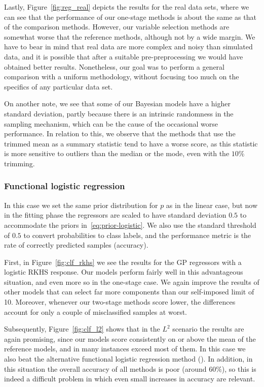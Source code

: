 \FloatBarrier{}

Lastly, Figure~\ref{fig:reg_real} depicts the results for the real data sets, where we can see that the performance of our one-stage methods is about the same as that of the comparison methods. However, our variable selection methods are somewhat worse that the reference methods, although not by a wide margin. We have to bear in mind that real data are more complex and noisy than simulated data, and it is possible that after a suitable pre-preprocessing we would have obtained better results. Nonetheless, our goal was to perform a general comparison with a uniform methodology, without focusing too much on the specifics of any particular data set.

On another note, we see that some of our Bayesian models have a higher standard deviation, partly because there is an intrinsic randomness in the sampling mechanism, which can be the cause of the occasional worse performance. In relation to this, we observe that the methods that use the trimmed mean as a summary statistic tend to have a worse score, as this statistic is more sensitive to outliers than the median or the mode, even with the \(10\%\) trimming.

\FloatBarrier{}
\subsubsection*{Functional logistic regression}

In this case we set the same prior distribution for \(p\) as in the linear case, but now in the fitting phase the regressors are scaled to have standard deviation \(0.5\) to accommodate the priors in~\eqref{eq:prior-logistic}. We also use the standard threshold of \(0.5\) to convert probabilities to class labels, and the performance metric is the rate of correctly predicted samples (accuracy). 

First, in Figure~\ref{fig:clf_rkhs} we see the results for the \acs{GP} regressors with a logistic \acs{RKHS} response. Our models perform fairly well in this advantageous situation, and even more so in the one-stage case. We again improve the results of other models that can select far more components than our self-imposed limit of 10. Moreover, whenever our two-stage methods score lower, the differences account for only a couple of misclassified samples at worst.

Subsequently, Figure~\ref{fig:clf_l2} shows that in the \(L^2\) scenario the results are again promising, since our models score consistently on or above the mean of the reference models, and in many instances exceed most of them. In this case we also beat the alternative functional logistic regression method (). In addition, in this situation the overall accuracy of all methods is poor (around \(60\%\)), so this is indeed a difficult problem in which even small increases in accuracy are relevant.

